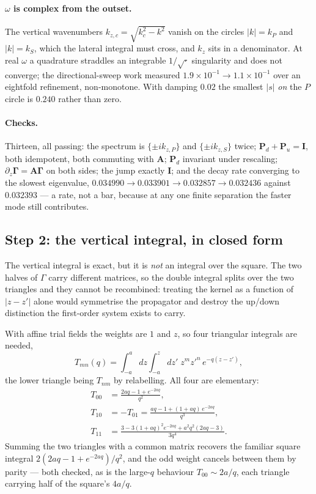 \documentclass[11pt,a4paper]{article}
\newcommand{\bI}{\mathbf{I}}
\newcommand{\bA}{\mathbf{A}}
\newcommand{\bP}{\mathbf{P}}
\begin{document}
\paragraph{$\omega$ is complex from the outset.}  The vertical wavenumbers
$k_{z,c} = \sqrt{k_c^2-k^2}$ vanish on the circles $|k| = k_P$ and $|k| = k_S$,
which the lateral integral must cross, and $k_z$ sits in a denominator.  At real
$\omega$ a quadrature straddles an integrable $1/\sqrt{\cdot}$ singularity and
does not converge; the directional-sweep work measured $1.9\times10^{-1} \to
1.1\times10^{-1}$ over an eightfold refinement, non-monotone.  With damping
$0.02$ the smallest $|s|$ \emph{on} the $P$ circle is $0.240$ rather than zero.

\paragraph{Checks.}  Thirteen, all passing: the spectrum is
$\{\pm ik_{z,P}\}$ and $\{\pm ik_{z,S}\}$ twice; $\bP_d+\bP_u=\bI$, both
idempotent, both commuting with $\bA$; $\bP_d$ invariant under rescaling;
$\partial_z\boldsymbol\Gamma = \bA\boldsymbol\Gamma$ on both sides; the jump
exactly $\bI$; and the decay rate converging to the slowest eigenvalue,
$0.034990 \to 0.033901 \to 0.032857 \to 0.032436$ against $0.032393$ --- a rate,
not a bar, because at any one finite separation the faster mode still
contributes.

\subsection{Step 2: the vertical integral, in closed form}

The vertical integral is exact, but it is \emph{not} an integral over the
square.  The two halves of $\Gamma$ carry different matrices, so the double
integral splits over the two triangles and they cannot be recombined: treating
the kernel as a function of $|z-z'|$ alone would symmetrise the propagator and
destroy the up/down distinction the first-order system exists to carry.

With affine trial fields the weights are $1$ and $z$, so four triangular
integrals are needed,
\begin{equation}\label{eq:tridef}
  T_{mn}(q) = \int_{-a}^{a}\!\!dz\int_{-a}^{z}\!\!dz'\;
              z^{m}z'^{n}\,e^{-q(z-z')},
\end{equation}
the lower triangle being $T_{nm}$ by relabelling.  All four are elementary:
\begin{align}
  T_{00} &= \frac{2aq - 1 + e^{-2aq}}{q^{2}}, \label{eq:T00}\\
  T_{10} &= -T_{01} = \frac{aq - 1 + (1+aq)\,e^{-2aq}}{q^{3}}, \label{eq:T10}\\
  T_{11} &= \frac{3 - 3(1+aq)^{2}e^{-2aq} + a^{2}q^{2}(2aq-3)}{3q^{4}}.
           \label{eq:T11}
\end{align}
Summing the two triangles with a common matrix recovers the familiar square
integral $2(2aq-1+e^{-2aq})/q^{2}$, and the odd weight cancels between them by
parity --- both checked, as is the large-$q$ behaviour $T_{00}\sim 2a/q$, each
triangle carrying half of the square's $4a/q$.
\end{document}
